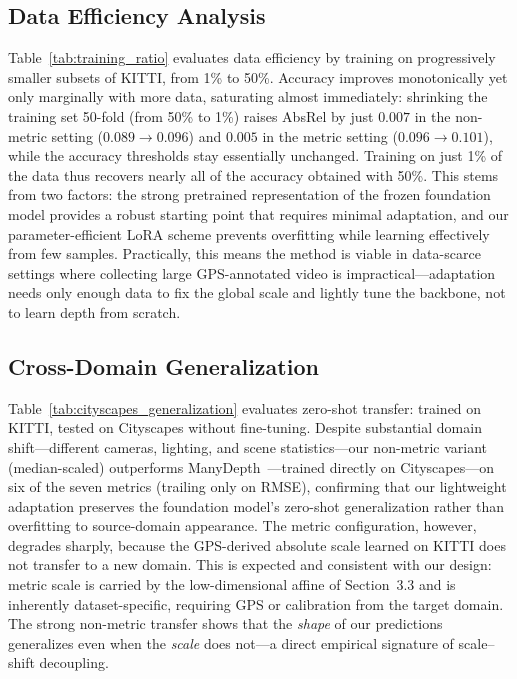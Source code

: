 \subsection{Data Efficiency Analysis}

Table~\ref{tab:training_ratio} evaluates data efficiency by training on progressively smaller subsets of KITTI, from 1\% to 50\%. Accuracy improves monotonically yet only marginally with more data, saturating almost immediately: shrinking the training set 50-fold (from 50\% to 1\%) raises AbsRel by just $0.007$ in the non-metric setting ($0.089\!\rightarrow\!0.096$) and $0.005$ in the metric setting ($0.096\!\rightarrow\!0.101$), while the accuracy thresholds stay essentially unchanged. Training on just 1\% of the data thus recovers nearly all of the accuracy obtained with 50\%. This stems from two factors: the strong pretrained representation of the frozen foundation model provides a robust starting point that requires minimal adaptation, and our parameter-efficient LoRA scheme prevents overfitting while learning effectively from few samples. Practically, this means the method is viable in data-scarce settings where collecting large GPS-annotated video is impractical---adaptation needs only enough data to fix the global scale and lightly tune the backbone, not to learn depth from scratch.



\subsection{Cross-Domain Generalization}

Table~\ref{tab:cityscapes_generalization} evaluates zero-shot transfer: trained on KITTI, tested on Cityscapes without fine-tuning. Despite substantial domain shift---different cameras, lighting, and scene statistics---our non-metric variant (median-scaled) outperforms ManyDepth~\cite{watson2021temporal}---trained directly on Cityscapes---on six of the seven metrics (trailing only on RMSE), confirming that our lightweight adaptation preserves the foundation model's zero-shot generalization rather than overfitting to source-domain appearance. The metric configuration, however, degrades sharply, because the GPS-derived absolute scale learned on KITTI does not transfer to a new domain. This is expected and consistent with our design: metric scale is carried by the low-dimensional affine of Section~3.3 and is inherently dataset-specific, requiring GPS or calibration from the target domain. The strong non-metric transfer shows that the \emph{shape} of our predictions generalizes even when the \emph{scale} does not---a direct empirical signature of scale--shift decoupling.




